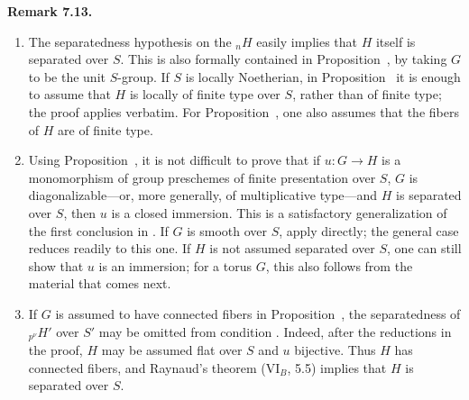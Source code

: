 \medskip
\noindent{}\textbf{Remark 7.13.}
\begin{enumerate}
  \item[(a)] The separatedness hypothesis on the \({}_nH\) easily implies
  that \(H\) itself is separated over \(S\). This is also formally contained
  in Proposition~, by taking
  \(G\) to be the unit \(S\)-group. If \(S\) is locally Noetherian, in
  Proposition~ it is enough to
  assume that \(H\) is locally of finite type over \(S\), rather than of
  finite type; the proof applies verbatim. For
  Proposition~, one also
  assumes that the fibers of \(H\) are of finite type.

  \item[(b)] Using Proposition~,
  it is not difficult to prove that if \(u:G\to H\) is a monomorphism of
  group preschemes of finite presentation over \(S\), \(G\) is
  diagonalizable---or, more generally, of multiplicative type---and \(H\)
  is separated over \(S\), then \(u\) is a closed immersion. This is a
  satisfactory generalization of the first conclusion in . If \(G\) is
  smooth over \(S\), apply  directly; the general case
  reduces readily to this one. If \(H\) is not assumed separated over \(S\),
  one can still show that \(u\) is an immersion; for a torus \(G\), this
  also follows from the material that comes next.

  \item[(c)] If \(G\) is assumed to have connected fibers in
  Proposition~, the
  separatedness of \({}_{p^\nu}H'\) over \(S'\) may be omitted from
  condition . Indeed, after the reductions in the proof, \(H\) may be
  assumed flat over \(S\) and \(u\) bijective. Thus \(H\) has connected
  fibers, and Raynaud's theorem (VI\(_B\), 5.5) implies that \(H\) is
  separated over \(S\).
\end{enumerate}

